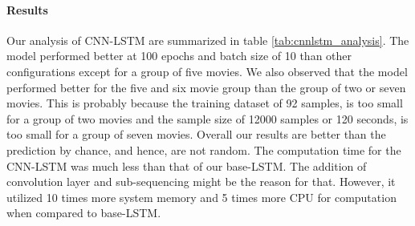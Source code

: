 \paragraph{Results} Our analysis of CNN-LSTM are summarized in table \ref{tab:cnnlstm_analysis}. The model performed better at 100 epochs and batch size of 10 than other configurations except for a group of five movies. We also observed that the model performed better for the five and six movie group than the group of two or seven movies. This is probably because the training dataset of 92 samples, is too small for a group of two movies and the sample size of 12000 samples or 120 seconds, is too small for a group of seven movies. Overall our results are better than the prediction by chance, and hence, are not random. The computation time for the CNN-LSTM was much less than that of our base-LSTM. The addition of convolution layer and sub-sequencing might be the reason for that. However, it utilized 10 times more system memory and 5 times more CPU for computation when compared to base-LSTM.
\begin{center}
\label{tab:cnnlstm_analysis}
\end{center}

